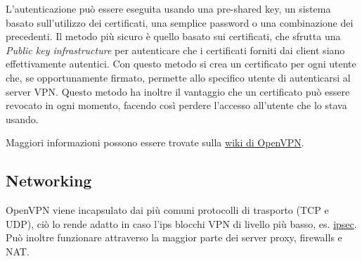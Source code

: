 L'autenticazione può essere eseguita usando una pre-shared key, un sistema basato sull'utilizzo dei certificati, una semplice password o una combinazione dei precedenti. Il metodo più sicuro è quello basato sui certificati, che sfrutta una \textit{Public key infrastructure} \cite{pki} per autenticare che i certificati forniti dai client siano effettivamente autentici. Con questo metodo si crea un certificato per ogni utente che, se opportunamente firmato, permette allo specifico utente di autenticarsi al server VPN. Questo metodo ha inoltre il vantaggio che un certificato può essere revocato in ogni momento, facendo così perdere l'accesso all'utente che lo stava usando. 

Maggiori informazioni possono essere trovate sulla \href{https://community.openvpn.net/openvpn/wiki/How_does_PKI_work}{wiki di OpenVPN}.

\subsection{Networking \workinprogress}
\label{subsec:openvpn-networking}

OpenVPN viene incapsulato dai più comuni protocolli di trasporto (TCP e UDP), ciò lo rende adatto in caso l'ips blocchi VPN di livello più basso, es. \href{https://en.wikipedia.org/wiki/IPsec}{ipsec}. Può inoltre funzionare attraverso la maggior parte dei server proxy, firewalls e NAT.

